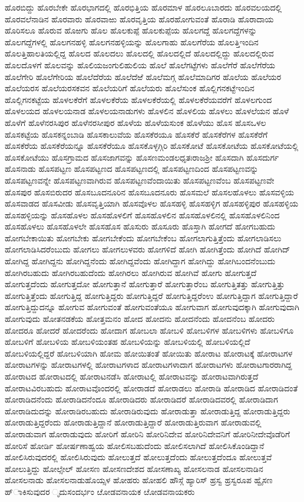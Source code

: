 {ಹೊರಬಿದ್ದು
ಹೊರಬೇಕೇ
ಹೊರಭಾಗದಲ್ಲಿ
ಹೊರಭಿತ್ತಿಯ
ಹೊರಮಾಳ
ಹೊರಲೂಬಾರದು
ಹೊರವಲಯದಲ್ಲಿ
ಹೊರವಲೆನಾಡಿನ
ಹೊರವಾರು
ಹೊರವಾಱು
ಹೊರವೃತ್ತಿಯ
ಹೊರಹೋಗುವಂತೆ
ಹೊರಾಡಿ
ಹೊರಾದಾಯ
ಹೊರಿಸಲೂ
ಹೊರುವ
ಹೊಱಗು
ಹೊಲ
ಹೊಲಕುಪ್ಪೆ
ಹೊಲಕುಪ್ಪೆಯ
ಹೊಲಗದ್ದೆ
ಹೊಲಗದ್ದೆಗಳನ್ನು
ಹೊಲಗದ್ದೆಗಳಲ್ಲಿ
ಹೊಲಗನಹಳ್ಳಿ
ಹೊಲಗನಹಳ್ಳಿಯನ್ನು
ಹೊಲಗಾಹು
ಹೊಲಗೆರೆಯ
ಹೊಲತ್ತಿಇಂದಿನ
ಹೊಲತ್ತಿಹಾಲತಿಯಲ್ಲಿದ್ದ
ಹೊಲದ
ಹೊಲದಲು
ಹೊಲದಲ್ಲಿ
ಹೊಲದಲ್ಲಿದೆ
ಹೊಲದಲ್ಲಿದ್ದು
ಹೊಲದಲ್ಲಿರುವ
ಹೊಲದೊಳಗೆ
ಹೊಲವನ್ನು
ಹೊಲಿಯಜಂಗುಲಿಹುಲಿಯ
ಹೊಲೆ
ಹೊಲೆಗಟ್ಟೆಗಳು
ಹೊಲೆಗೆರೆ
ಹೊಲೆಗೆರೆಯ
ಹೊಲೆಗೇರಿ
ಹೊಲೆಗೇರಿಯ
ಹೊಲೆದೆರೆಯ
ಹೊಲೆದೆಱೆ
ಹೊಲೆಮಗ್ಗ
ಹೊಲೆಮಾದಿಗರ
ಹೊಲೆಯ
ಹೊಲೆಯರ
ಹೊಲೆಯರಸ
ಹೊಲೆಯರಸಕವನ
ಹೊಲೆಯರಿಗೆ
ಹೊಲೆಯರು
ಹೊಲೆಸುಂಕ
ಹೊಲ್ಲಿಗನಕಟ್ಟೆಇಂದಿನ
ಹೊಲ್ಲಿಗನಕಟ್ಟೆಯ
ಹೊಳಲಕೆರೆಗೆ
ಹೊಳಲಕೆರೆಯ
ಹೊಳಲಕೆರೆಯಲ್ಲಿ
ಹೊಳಲಕೆರೆಯವರೆಗೆ
ಹೊಳಲಗುಂದ
ಹೊಳಲಯದ
ಹೊಳಲಯನಾಡ
ಹೊಳಲಯನಾಡುಗಳು
ಹೊಳಲಿನ
ಹೊಳಲಿಯ
ಹೊಳಲು
ಹೊಳಲೆಯನ
ಹೊಳೆ
ಹೊಳೆಗೆ
ಹೊಳೆನರಸಿಪುರ
ಹೊಳೆನರಸೀಪುರ
ಹೊಳೆಯ
ಹೊಳೆಯಸುಂಕ
ಹೊಳೆಯು
ಹೊಸ
ಹೊಸಒಳಲ
ಹೊಸಕಟ್ಟೆಯ
ಹೊಸಕನ್ನಂಬಾಡಿ
ಹೊಸಕಾಲುವೆಯ
ಹೊಸಕೆರಯೂ
ಹೊಸಕೆರೆ
ಹೊಸಕೆರೆಗಳ
ಹೊಸಕೆರೆಗೆ
ಹೊಸಕೆರೆಯ
ಹೊಸಕೆರೆಯನ್ನೂ
ಹೊಸಕೆರೆಯೂ
ಹೊಸಕೊಳ್ಳಗ್ಗಿರಿ
ಹೊಸಕೋಟೆ
ಹೊಸಕೋಟೆಯ
ಹೊಸಕೋಟೆಯಲ್ಲಿ
ಹೊಸಕೋಟೆಯು
ಹೊಸಗ್ರಾಮದ
ಹೊಸಜಾಗವನ್ನು
ಹೊಸಣಮಂಡಲಧೃತಃರಾಜಶ್ರೀ
ಹೊಸದಾಗಿ
ಹೊಸದುರ್ಗ
ಹೊಸನಾಡು
ಹೊಸಪಟ್ಟಣ
ಹೊಸಪಟ್ಟಣದ
ಹೊಸಪಟ್ಟಣದಲ್ಲಿ
ಹೊಸಪಟ್ಟಣದಿಂದ
ಹೊಸಪಟ್ಟಣವನ್ನು
ಹೊಸಪಟ್ಟಣವನ್ನೇ
ಹೊಸಪಟ್ಟಣವಾಗಿರುವ
ಹೊಸಪಟ್ಟಣವೆಂದಾಯಿತು
ಹೊಸಪಟ್ಟಣವೆಂಬ
ಹೊಸಪಟ್ಟಣವೇ
ಹೊಸಪುರ
ಹೊಸಬಿರುದರ
ಹೊಸಬೂದನೂರಿನ
ಹೊಸಬೂದನೂರು
ಹೊಸಮಲೆ
ಹೊಸಲಹೊಳಲು
ಹೊಸವಳ್ಳಿಯ
ಹೊಸವಾಡದ
ಹೊಸವೀಡು
ಹೊಸವೃತ್ತಿಯಾಗಿ
ಹೊಸವೊಳಲ
ಹೊಸಹಳ್ಳಿ
ಹೊಸಹಳ್ಳಿಗ
ಹೊಸಹಳ್ಳಿಪುರ
ಹೊಸಹಳ್ಳಿಯ
ಹೊಸಹಳ್ಳಿಯನ್ನು
ಹೊಸಹೊಳಲ
ಹೊಸಹೊಳಲಿಗೆ
ಹೊಸಹೊಳಲಿನ
ಹೊಸಹೊಳಲಿನಲ್ಲಿ
ಹೊಸಹೊಳಲಿನಿಂದ
ಹೊಸಹೊಳಲು
ಹೊಸಹೊಳಲೇ
ಹೊಸಹೊಸ
ಹೊಸುರು
ಹೊಸೂರು
ಹೊಸ್ತಾಗಿ
ಹೋಗದೆ
ಹೋಗಬಹುದು
ಹೋಗಬೇಕಾಯಿತು
ಹೋಗಬೇಕು
ಹೋಗಬೇಕೆಂದು
ಹೋಗಬೇಕೆಂಬ
ಹೋಗಲಾಗುತ್ತಿತ್ತೆಂದು
ಹೋಗಲಾಡಿಸಲು
ಹೋಗಲಾಡಿಸಿದರೆಂಬುದು
ಹೋಗಲು
ಹೋಗಲುಳವರು
ಹೋಗಳಿದೆ
ಹೋಗಿ
ಹೋಗಿತ್ತೆಂದು
ಹೋಗಿದೆ
ಹೋಗಿದ್
ಹೋಗಿದ್ದ
ಹೋಗಿದ್ದನು
ಹೋಗಿದ್ದನೆಂದು
ಹೋಗಿದ್ದವೆಂದು
ಹೋಗಿದ್ದಾಗ
ಹೋಗಿದ್ದು
ಹೋಗಿಬಂದನೆಂಬುದು
ಹೋಗಿರಬಹುದು
ಹೋಗಿರಬಹುದೆಂದು
ಹೋಗಿರಲು
ಹೋಗಿರುವ
ಹೋಗಿವೆ
ಹೋಗು
ಹೋಗುತ್ತದೆ
ಹೋಗುತ್ತದೆಂದು
ಹೋಗುತ್ತದೋ
ಹೋಗುತ್ತಾನೆ
ಹೋಗುತ್ತಾರೆ
ಹೋಗುತ್ತಾರೆಂಬ
ಹೋಗುತ್ತಿತತ್ತು
ಹೋಗುತ್ತಿತ್ತು
ಹೋಗುತ್ತಿತ್ತೆಂದು
ಹೋಗುತ್ತಿದ್ದ
ಹೋಗುತ್ತಿದ್ದರು
ಹೋಗುತ್ತಿದ್ದರೆ
ಹೋಗುತ್ತಿದ್ದರೆಂಉ
ಹೋಗುತ್ತಿದ್ದಾಗ
ಹೋಗುತ್ತಿದ್ದಾರೆ
ಹೋಗುತ್ತಿದ್ದುದನ್ನೂ
ಹೋಗುವ
ಹೋಗುವಂತೆ
ಹೋಗುವಂತೆಯೂ
ಹೋಗುವಾಗ
ಹೋಗುವುದಕ್ಕಾಗಿ
ಹೋಗುವುದಾಗಿ
ಹೋಗುವುದು
ಹೋತನಡಕೆಯ
ಹೋತ್ತಮನಂ
ಹೋದ
ಹೋದನು
ಹೋದನೆಂದು
ಹೋದನೆಂಬ
ಹೋದರು
ಹೋದರೂ
ಹೋದರೆ
ಹೋದರೆಂದು
ಹೋದಾಗ
ಹೋಬಲಾ
ಹೋಬಳಿ
ಹೋಬಳಿಗಳ
ಹೋಬಳಿಗಳು
ಹೋಬಳಿಗೂ
ಹೋಬಳಿಗೆ
ಹೋಬಳಿಯ
ಹೋಬಳಿಯಂತಹ
ಹೋಬಳಿಯನ್ನು
ಹೋಬಳಿಯಲ್ಲಿ
ಹೋಬಳಿಯಲ್ಲಿದೆ
ಹೋಬಳಿಯಲ್ಲಿದ್ದರೆ
ಹೋಬಳಿಯಾಗಿ
ಹೋಮ
ಹೋಯಿತಂತೆ
ಹೋಯಿತು
ಹೋರಾಟ
ಹೋರಾಟಕ್ಕೆ
ಹೋರಾಟಗಳ
ಹೋರಾಟಗಳನ್ನು
ಹೋರಾಟಗಳಲ್ಲಿ
ಹೋರಾಟಗಳಾದ
ಹೋರಾಟಗಳಾದಾಗ
ಹೋರಾಟಗಳು
ಹೋರಾಟಗಾರರಾಗಿದ್ದ
ಹೋರಾಟದ
ಹೋರಾಟದಲ್ಲಿ
ಹೋರಾಟನಡೆಸಿ
ಹೋರಾಟಲ್ಲಿ
ಹೋರಾಟವನ್ನು
ಹೋರಾಟವಾಗಿರುತ್ತದೆ
ಹೋರಾಟವಿರಬಹುದು
ಹೋರಾಟವೊಂದರಲ್ಲಿ
ಹೋರಾಡದೆ
ಹೋರಾಡಲು
ಹೋರಾಡಿ
ಹೋರಾಡಿದ
ಹೋರಾಡಿದಂತೆ
ಹೋರಾಡಿದನೆಂದು
ಹೋರಾಡಿದನೆಂದೂ
ಹೋರಾಡಿದರು
ಹೋರಾಡಿದರೆ
ಹೋರಾಡಿದವರಲ್ಲಿ
ಹೋರಾಡಿದಾಗ
ಹೋರಾಡಿದುದನ್ನು
ಹೋರಾಡಿರಬಹುದು
ಹೋರಾಡಿರುವುದು
ಹೋರಾಡುತ್ತಾ
ಹೋರಾಡುತ್ತಿದ್ದ
ಹೋರಾಡುತ್ತಿದ್ದರು
ಹೋರಾಡುತ್ತಿದ್ದರೆಂದು
ಹೋರಾಡುತ್ತಿದ್ದಾನೆ
ಹೋರಾಡುತ್ತಿದ್ದಾರೆ
ಹೋರಾಡುತ್ತಿರುವಾಗ
ಹೋರಾಡುವಲ್ಲಿ
ಹೋರಾಡುವಾಗ
ಹೋರಾಡುವುದು
ಹೋರಿಗೆ
ಹೋರಿನಿ
ಹೋರಿನಿದೇವ
ಹೋರಿನಿದೇವನಿಗೆ
ಹೋರಿನೀದೇವೊಡೆರಿಗೆ
ಹೋರಿಸೆ
ಹೋರ್ಡಿ
ಹೋರ್ಷಣಾಹ್ವಯ
ಹೋಲಿಸಬಹುದೆಂದು
ಹೋಲಿಸಲಾಗಿದೆ
ಹೋಲಿಸಿಕೊಂಡಿದ್ದಾನೆ
ಹೋಲಿಸಿರುವುದರಲ್ಲಿ
ಹೋಲಿಸಿರುವುದು
ಹೋಲುತ್ತದೆ
ಹೋಲುತ್ತದೆಂದು
ಹೋಲುತ್ತದೆಂದೂ
ಹೋಲುತ್ತವೆ
ಹೋಲುತ್ತಿದ್ದು
ಹೋಲ್ಸೇಲ್
ಹೋಸಣ
ಹೋಸಣದೇಶದ
ಹೋಸಣಾಖ್ಯ
ಹೋಸಲನಾಡ
ಹೋಸಲನಾಡಿನ
ಹೋಸಲನಾಡು
ಹೋಸಲನಾಡುಹೊಯ್ಸಳ
ಹೋಹರು
ಹೋಹಲಿ
ಹೌಸ್ಗೆ
ಹ್ಯಾರಿಸ್
ಹ್ರಸ್ವ
ಹ್ರಸ್ವರೂಪ
ಹ್ವೈಸಣ
ಹ್ಾಕಿಸುವುದರ
ೃದುಸಂದರ್ಭಂ
ೞೋಡವನಾಯಕ
ೞೋಡವನಾಯಕರು
}
